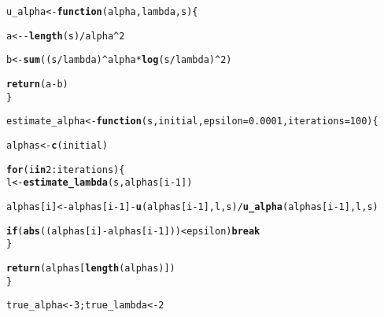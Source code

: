 \documentclass[11pt, a4paper]{article}\usepackage[]{graphicx}\usepackage[]{xcolor}
\makeatletter
\newcommand{\hlnum}[1]{\textcolor[rgb]{0.686,0.059,0.569}{#1}}%
\newcommand{\hlopt}[1]{\textcolor[rgb]{0,0,0}{#1}}%
\newcommand{\hldef}[1]{\textcolor[rgb]{0.345,0.345,0.345}{#1}}%
\newcommand{\hlkwa}[1]{\textcolor[rgb]{0.161,0.373,0.58}{\textbf{#1}}}%
\newcommand{\hlkwb}[1]{\textcolor[rgb]{0.69,0.353,0.396}{#1}}%
\newcommand{\hlkwc}[1]{\textcolor[rgb]{0.333,0.667,0.333}{#1}}%
\newcommand{\hlkwd}[1]{\textcolor[rgb]{0.737,0.353,0.396}{\textbf{#1}}}%
\newenvironment{kframe}{%
 \def\at@end@of@kframe{}%
 \ifinner\ifhmode%
  \def\at@end@of@kframe{\end{minipage}}%
  \begin{minipage}{\columnwidth}%
 \fi\fi%
 \def\FrameCommand##1{\hskip\@totalleftmargin \hskip-\fboxsep
 \colorbox{shadecolor}{##1}\hskip-\fboxsep
     \hskip-\linewidth \hskip-\@totalleftmargin \hskip\columnwidth}%
 \MakeFramed {\advance\hsize-\width
   \@totalleftmargin\z@ \linewidth\hsize
   \@setminipage}}%
 {\par\unskip\endMakeFramed%
 \at@end@of@kframe}
\newenvironment{knitrout}{}{} %
\makeatother
\begin{document}
\begin{knitrout}
\color{fgcolor}\begin{kframe}
\begin{alltt}
\hldef{u_alpha} \hlkwb{<-} \hlkwa{function}\hldef{(}\hlkwc{alpha}\hldef{,} \hlkwc{lambda}\hldef{,} \hlkwc{s}\hldef{)\{}

  \hldef{a} \hlkwb{<-} \hlopt{-} \hlkwd{length}\hldef{(s)} \hlopt{/} \hldef{alpha}\hlopt{^}\hlnum{2}

  \hldef{b} \hlkwb{<-} \hlkwd{sum}\hldef{((s} \hlopt{/} \hldef{lambda)}\hlopt{^}\hldef{alpha} \hlopt{*} \hlkwd{log}\hldef{(s} \hlopt{/} \hldef{lambda)}\hlopt{^}\hlnum{2}\hldef{)}

  \hlkwd{return}\hldef{(a} \hlopt{-} \hldef{b)}
\hldef{\}}
\end{alltt}
\end{kframe}
\end{knitrout}


\begin{knitrout}
\color{fgcolor}\begin{kframe}
\begin{alltt}
\hldef{estimate_alpha} \hlkwb{<-} \hlkwa{function}\hldef{(}\hlkwc{s}\hldef{,} \hlkwc{initial}\hldef{,} \hlkwc{epsilon} \hldef{=} \hlnum{0.0001}\hldef{,} \hlkwc{iterations} \hldef{=} \hlnum{100}\hldef{)\{}

  \hldef{alphas} \hlkwb{<-} \hlkwd{c}\hldef{(initial)}

  \hlkwa{for} \hldef{(i} \hlkwa{in} \hlnum{2}\hlopt{:}\hldef{iterations) \{}
    \hldef{l} \hlkwb{<-} \hlkwd{estimate_lambda}\hldef{(s, alphas[i}\hlopt{-}\hlnum{1}\hldef{])}

    \hldef{alphas[i]} \hlkwb{<-} \hldef{alphas[i}\hlopt{-}\hlnum{1}\hldef{]} \hlopt{-} \hlkwd{u}\hldef{(alphas[i}\hlopt{-}\hlnum{1}\hldef{], l, s)} \hlopt{/} \hlkwd{u_alpha}\hldef{(alphas[i}\hlopt{-}\hlnum{1}\hldef{], l, s)}

    \hlkwa{if}\hldef{(}\hlkwd{abs}\hldef{((alphas[i]} \hlopt{-} \hldef{alphas[i}\hlopt{-}\hlnum{1}\hldef{]))} \hlopt{<} \hldef{epsilon)} \hlkwa{break}
  \hldef{\}}

  \hlkwd{return}\hldef{(alphas[}\hlkwd{length}\hldef{(alphas)])}
\hldef{\}}
\end{alltt}
\end{kframe}
\end{knitrout}

\begin{knitrout}
\color{fgcolor}\begin{kframe}
\begin{alltt}
\hldef{true_alpha} \hlkwb{<-} \hlnum{3}\hldef{; true_lambda} \hlkwb{<-} \hlnum{2}
\end{alltt}
\end{kframe}
\end{knitrout}
\end{document}

